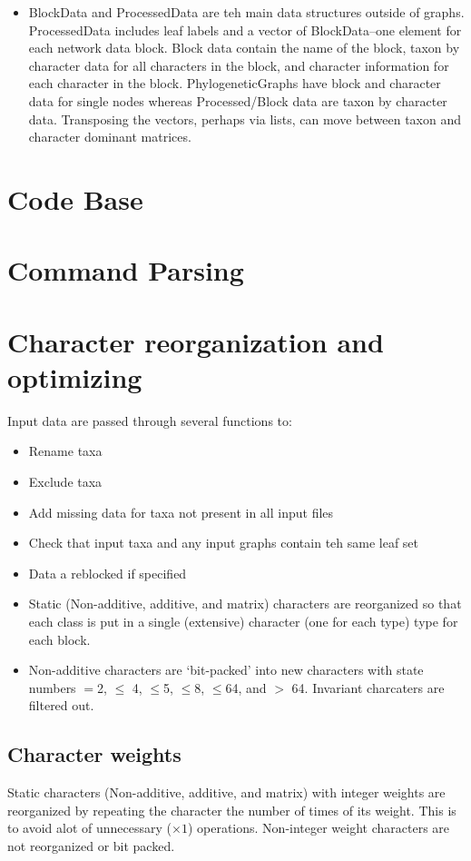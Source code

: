 \documentclass[11pt]{article}
\begin{document}
\begin{itemize}
		\item{BlockData and ProcessedData are teh main data structures outside of graphs.  ProcessedData includes leaf labels and a 
			vector of BlockData--one element for each network data block.  Block data contain the name of the block, taxon by character 
			data for all characters in the block, and character information for each character in the block.  PhylogeneticGraphs have block and 
			character data for single nodes whereas Processed/Block data are taxon by character data.  Transposing the vectors, perhaps
			via lists, can move between taxon and character dominant  matrices.}
		
	\end{itemize}
	
	
	\section{Code Base}
	
	\section {Command Parsing}
	
	\section{Character reorganization and optimizing}
		Input data are passed through several functions to:
		\begin{itemize}
			\item{Rename taxa}
			\item{Exclude taxa}
			\item{Add missing data for taxa not present in all input files}
			\item{Check that input taxa and any input graphs contain teh same leaf set}
			\item{Data a reblocked if specified}
			\item{Static (Non-additive, additive, and matrix) characters are reorganized so that
				each class is put in a single (extensive) character (one for each type) type for each block.}
			\item{Non-additive characters are `bit-packed' into new characters with state numbers $=$2, $\leq$
				4, $\leq$5, $\leq$8, $\leq$64, and $>$ 64. Invariant charcaters are filtered out.}
			 
		\end{itemize}
		\subsection{Character weights}
		Static characters (Non-additive, additive, and matrix) with integer weights are reorganized
		by repeating the character the number of times of its weight.  This is to avoid alot of 
		unnecessary ($\times 1$) operations.  Non-integer weight characters are not reorganized or
		bit packed.
		
\end{document}
